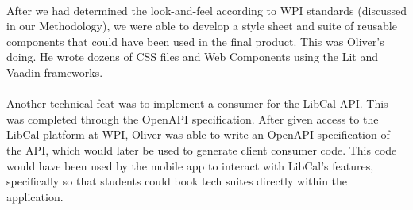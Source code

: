 \paragraph{}
After we had determined the look-and-feel according to WPI standards (discussed in our Methodology), we were able to develop a style sheet and suite of reusable components that could have been used in the final product. This was Oliver's doing. He wrote dozens of CSS files and Web Components using the Lit and Vaadin frameworks.

\paragraph{}
Another technical feat was to implement a consumer for the LibCal API. This was completed through the OpenAPI specification. After given access to the LibCal platform at WPI, Oliver was able to write an OpenAPI specification of the API, which would later be used to generate client consumer code. This code would have been used by the mobile app to interact with LibCal's features, specifically so that students could book tech suites directly within the application.





 

 
